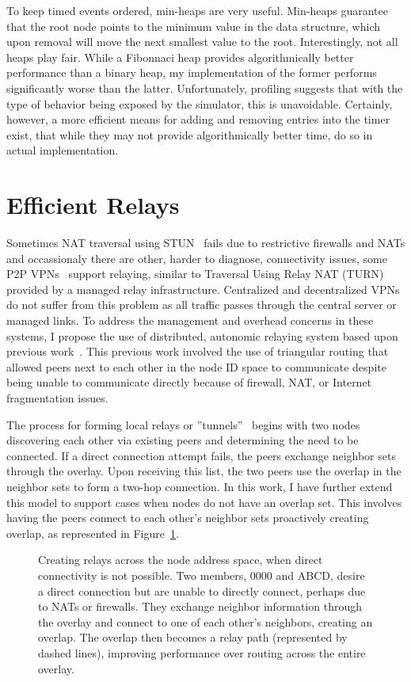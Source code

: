 To keep timed events ordered, min-heaps are very useful.  Min-heaps guarantee
that the root node points to the minimum value in the data structure, which
upon removal will move the next smallest value to the root.  Interestingly, not
all heaps play fair.  While a Fibonnaci heap provides algorithmically better
performance than a binary heap, my implementation of the former performs
significantly worse than the latter.  Unfortunately, profiling suggests that
with the type of behavior being exposed by the simulator, this is unavoidable.
Certainly, however, a more efficient means for adding and removing entries into
the timer exist, that while they may not provide algorithmically better time,
do so in actual implementation.

\section{Efficient Relays}

Sometimes NAT traversal using STUN~\cite{stun} fails due to restrictive
firewalls and NATs and occassionaly there are other, harder to diagnose,
connectivity issues, some P2P VPNs~\cite{hamachi, gbridge} support relaying,
similar to Traversal Using Relay NAT (TURN)~\cite{turn} provided by a managed
relay infrastructure.  Centralized and decentralized VPNs do not suffer from
this problem as all traffic passes through the central server or managed links.
To address the management and overhead concerns in these systems, I propose the
use of distributed, autonomic relaying system based upon previous
work~\cite{hpdc08_0,epost}.  This previous work involved the use of triangular
routing that allowed peers next to each other in the node ID space to
communicate despite being unable to communicate directly because of firewall,
NAT, or Internet fragmentation issues.

The process for forming local relays or ''tunnels''~\cite{hpdc08_0} begins with
two nodes discovering each other via existing peers and determining the need to
be connected.  If a direct connection attempt fails, the peers exchange
neighbor sets through the overlay.  Upon receiving this list, the two peers use
the overlap in the neighbor sets to form a two-hop connection.  In this work, I
have further extend this model to support cases when nodes do not have an
overlap set.  This involves having the peers connect to each other's neighbor
sets proactively creating overlap, as represented in Figure~\ref{fig:relay}.

\begin{figure}[ht]
\centering
{}
\caption[Motivation for relays]{Creating relays across the node address space,
when direct connectivity is not possible.  Two members, 0000 and ABCD,  desire
a direct connection but are unable to directly connect, perhaps due to NATs or
firewalls.  They exchange neighbor information through the overlay and connect
to one of each other's neighbors, creating an overlap.  The overlap then
becomes a relay path (represented by dashed lines), improving performance over
routing across the entire overlay.}
\label{fig:relay}
\end{figure}

